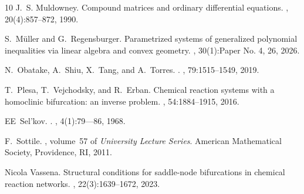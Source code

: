 \documentclass[11pt]{amsart}
\theoremstyle{definition}
\begin{document}
\begin{thebibliography}{10}
J.~S. Muldowney.
\newblock Compound matrices and ordinary differential equations.
, 20(4):857--872, 1990.

S.~M\"uller and G.~Regensburger.
\newblock Parametrized systems of generalized polynomial inequalities via
  linear algebra and convex geometry.
, 30(1):Paper No. 4, 26, 2026.

N.~Obatake, A.~Shiu, X.~Tang, and A.~Torres.
.
, 79:1515--1549, 2019.

T.~Plesa, T.~Vejchodsky, and R.~Erban.
\newblock Chemical reaction systems with a homoclinic bifurcation: an inverse
  problem.
, 54:1884–1915, 2016.

EE~Sel'kov.
.
, 4(1):79—86, 1968.

F.~Sottile.
, volume~57 of {\em
  University Lecture Series}.
\newblock American Mathematical Society, Providence, RI, 2011.

Nicola Vassena.
\newblock Structural conditions for saddle-node bifurcations in chemical
  reaction networks.
, 22(3):1639--1672, 2023.

\end{thebibliography}
\end{document}
